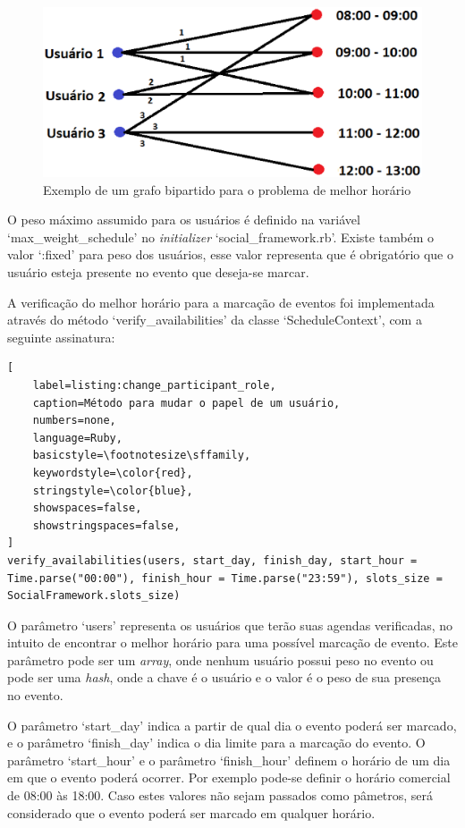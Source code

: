 \begin{figure}[h]
    \centering
    \includegraphics[scale=0.6]{figuras/social_framework/melhor_horario.eps}
    \caption{Exemplo de um grafo bipartido para o problema de melhor horário}
    \label{melhor_horario}
\end{figure}

O peso máximo assumido para os usuários é definido na variável `max\_weight\_schedule' no \textit{initializer} `social\_framework.rb'. Existe também o valor `:fixed' para peso dos usuários, esse valor representa que é obrigatório que o usuário esteja presente no evento que deseja-se marcar.

A verificação do melhor horário para a marcação de eventos foi implementada através do método `verify\_availabilities' da classe `ScheduleContext', com a seguinte assinatura:

\begin{lstlisting}[
    label=listing:change_participant_role,
    caption=Método para mudar o papel de um usuário,
    numbers=none,
    language=Ruby,
    basicstyle=\footnotesize\sffamily,
    keywordstyle=\color{red},
    stringstyle=\color{blue},
    showspaces=false,
    showstringspaces=false,
]
verify_availabilities(users, start_day, finish_day, start_hour = Time.parse("00:00"), finish_hour = Time.parse("23:59"), slots_size = SocialFramework.slots_size)
\end{lstlisting}

O parâmetro `users' representa os usuários que terão suas agendas verificadas, no intuito de encontrar o melhor horário para uma possível marcação de evento. Este parâmetro pode ser um \textit{array}, onde nenhum usuário possui peso no evento ou pode ser uma \textit{hash}, onde a chave é o usuário e o valor é o peso de sua presença no evento.

O parâmetro `start\_day' indica a partir de qual dia o evento poderá ser marcado, e o parâmetro `finish\_day' indica o dia limite para a marcação do evento. O parâmetro `start\_hour' e o parâmetro `finish\_hour' definem o horário de um dia em que o evento poderá ocorrer. Por exemplo pode-se definir o horário comercial de 08:00 às 18:00. Caso estes valores não sejam passados como pâmetros, será considerado que o evento poderá ser marcado em qualquer horário.

